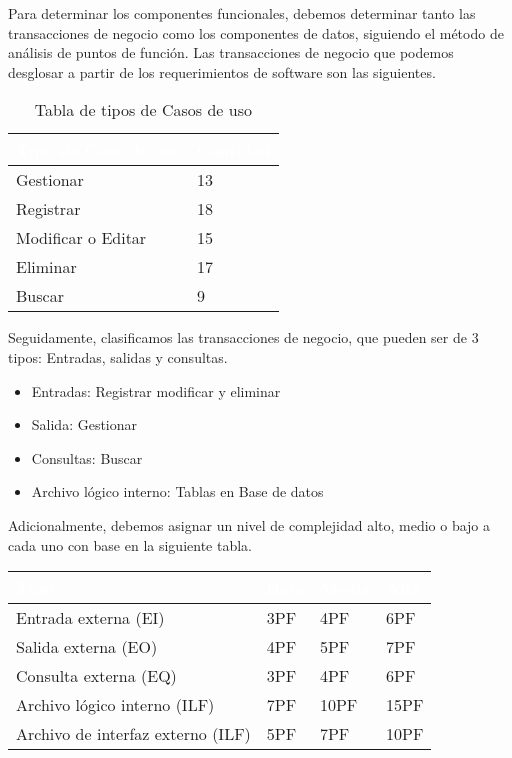 Para determinar los componentes funcionales, debemos determinar tanto las transacciones de negocio como los componentes de datos, siguiendo el método de análisis de puntos de función.  Las transacciones de negocio que podemos desglosar a partir de los requerimientos de software son las siguientes.

\begin{table}[H]
	\centering
	\begin{tabular}{|p{4cm}|p{4cm}|}
		\hline
		\rowcolor{black} \textcolor{white} {\textbf{Tipo de Caso de uso}} & \textcolor{white}{\textbf{Cantidad}} \\ \hline
		Gestionar & 13  \\
		\hline
		Registrar & 18  \\
		\hline
		Modificar o Editar & 15  \\
		\hline
		Eliminar & 17  \\
		\hline
		Buscar & 9  \\
		\hline
	
	\end{tabular}
	 \caption{Tabla de tipos de Casos de uso}
	 \label{tbl:costos}
\end{table}

Seguidamente, clasificamos las transacciones de negocio, que pueden ser de 3 tipos: Entradas, salidas y consultas. 

\begin{itemize}
\item Entradas: Registrar modificar y eliminar
\item Salida: Gestionar
\item Consultas: Buscar
\item Archivo lógico interno: Tablas en Base de datos

\end{itemize}

Adicionalmente, debemos asignar un nivel de complejidad alto, medio o bajo a cada uno con base en la siguiente tabla.

	\begin{table}[H]
	\centering
	\begin{tabular}{|p{3cm}|p{1cm}|p{1cm}|p{1cm}|}
		\hline
		\rowcolor{black} \textcolor{white} {\textbf{Tipo}} & \textcolor{white}{\textbf{Baja}} & \textcolor{white}{\textbf{Media}} & \textcolor{white}{\textbf{Alta}} \\ \hline
		Entrada  externa (EI) & 3PF & 4PF & 6PF  \\
		\hline
		Salida  externa (EO) & 4PF & 5PF & 7PF  \\
		\hline
		Consulta  externa (EQ) & 3PF & 4PF & 6PF  \\
		\hline
		Archivo lógico interno (ILF) & 7PF & 10PF & 15PF  \\
		\hline
		Archivo de interfaz externo (ILF) & 5PF & 7PF & 10PF  \\
		\hline
	\end{tabular}
\end{table}


